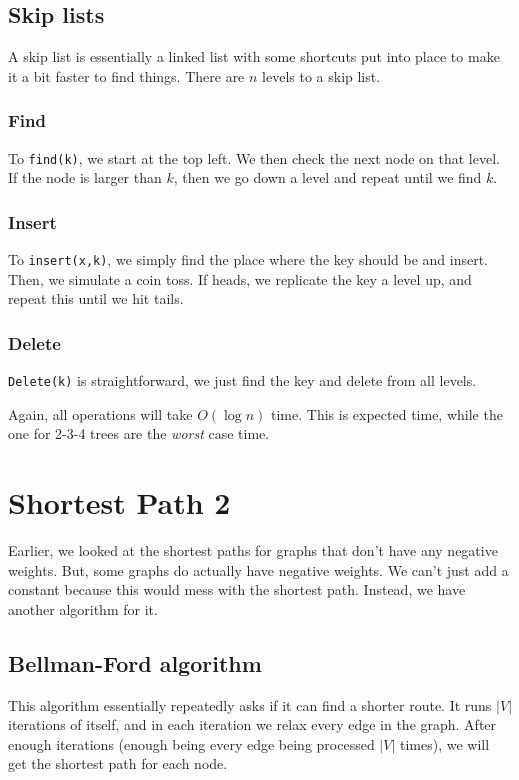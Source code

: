 \documentclass[11pt,fleqn,a4paper,titlepage,dvipsnames,cmyk]{scrartcl}
\begin{document}
\subsection{Skip lists}%
\label{sub:skip-list}
A skip list is essentially a linked list with some shortcuts put into
place to make it a bit faster to find things. There are $n$ levels to a
skip list.

\subsubsection{Find}%
\label{ssub:find-skip}
To \texttt{find(k)}, we start at the top left. We then check the next node
on that level. If the node is larger than $k$, then we go down a level and
repeat until we find $k$.

\subsubsection{Insert}%
\label{ssub:insert-skip}
To \texttt{insert(x,k)}, we simply find the place where the key should be
and insert. Then, we simulate a coin toss. If heads, we replicate the key
a level up, and repeat this until we hit tails.

\subsubsection{Delete}%
\label{ssub:delete-skip}
\texttt{Delete(k)} is straightforward, we just find the key and delete
from all levels.

Again, all operations will take $O(\log n)$ time. This is expected time,
while the one for 2-3-4 trees are the \textit{worst} case time.

\section{Shortest Path 2}%
\label{sec:short-path-2}
Earlier, we looked at the shortest paths for graphs that don't have any
negative weights. But, some graphs do actually have negative weights. We
can't just add a constant because this would mess with the shortest path.
Instead, we have another algorithm for it.

\subsection{Bellman-Ford algorithm}%
\label{sub:Bellman-Ford algorithm}
This algorithm essentially repeatedly asks if it can find a shorter route.
It runs $|V|$ iterations of itself, and in each iteration we relax every
edge in the graph. After enough iterations (enough being every edge being
processed $|V|$ times), we will get the shortest path for each node.
\end{document}

